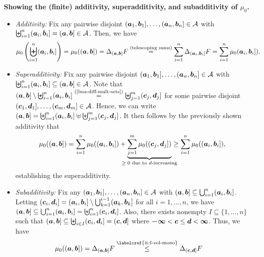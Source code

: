 \begin{enumerate}
\begin{pf}
\textbf{Showing the (finite) additivity, superadditivity, and subadditivity of \(\mu_0\).}
\begin{itemize}
\item \emph{Additivity:} Fix any pairwise disjoint \((\bm{a}_1,\bm{b}_1]
,\dotsc,(\bm{a}_n,\bm{b}_n]\in\mathcal{A}\) with
\(\biguplus_{i=1}^{n}(\bm{a}_i,\bm{b}_i]=(\bm{a},\bm{b}]\in\mathcal{A}\).
Then, we have
\[
\mu_0\left(\biguplus_{i=1}^{n}(\bm{a}_i,\bm{b}_i]\right)
=\mu_0((\bm{a},\bm{b}])
=\Delta_{(\bm{a},\bm{b}]}F
\overset{\text{(telescoping sums)}}{=}\sum_{i=1}^{n}\Delta_{(\bm{a}_i,\bm{b}_i]}F
=\sum_{i=1}^{n}\mu_0(\bm{a}_i,\bm{b}_i]).
\]
\item \emph{Superadditivity:} Fix any pairwise disjoint \((\bm{a}_1,\bm{b}_1]
,\dotsc,(\bm{a}_n,\bm{b}_n]\in\mathcal{A}\) with
\(\biguplus_{i=1}^{n}(\bm{a}_i,\bm{b}_i]\subseteq (\bm{a},\bm{b}]\in\mathcal{A}\).
Note that \((\vect{a},\vect{b}]\setminus \biguplus_{i=1}^{n}(\vect{a}_i,\vect{b}_i]
\overset{\text{(\Cref{lma:diff-mult-sets})}}{=}
\biguplus_{j=1}^{m}(\vect{c}_j,\vect{d}_j]\)
for some pairwise disjoint
\((\bm{c}_1,\bm{d}_1],\dotsc,(\bm{c}_m,\bm{d}_m]\in\mathcal{A}\).
Hence, we can write \((\bm{a},\bm{b}]=\biguplus_{i=1}^{n}(\bm{a}_i,\bm{b}_i]
\uplus\biguplus_{j=1}^{m}(\bm{c}_j,\bm{d}_j]\). It then follows by the
previously shown additivity that
\[
\mu_0((\vect{a},\vect{b}])
=\sum_{i=1}^{n}\mu_0((\vect{a}_i,\vect{b}_i])
+\underbrace{\sum_{j=1}^{m}\mu_0((\vect{c}_j,\vect{d}_j])}_{\mathclap{\text{\(\ge 0\) due to \(d\)-increasing}}}
\ge\sum_{i=1}^{n}\mu_0((\vect{a}_i,\vect{b}_i]),
\]
establishing the superadditivity.
\item \emph{Subadditivity:} Fix any
\((\bm{a}_1,\bm{b}_1],\dotsc,(\bm{a}_n,\bm{b}_n]\in\mathcal{A}\) with
\((\bm{a},\bm{b}]\subseteq \bigcup_{i=1}^{n}(\bm{a}_i,\bm{b}_i]\).
Letting \((\bm{c}_i,\bm{d}_i]=(\bm{a}_i,\bm{b}_i]\setminus
\bigcup_{k=1}^{i-1}(\bm{a}_k,\bm{b}_k]\) for all \(i=1,\dotsc,n\), we have
\((\bm{a},\bm{b}]\subseteq \bigcup_{i=1}^{n}(\bm{a}_i,\bm{b}_i]
=\biguplus_{i=1}^{n}(\bm{c}_i,\bm{d}_i]\). Also, there exists nonempty
\(I\subseteq \{1,\dotsc,n\}\) such that \((\bm{a},\bm{b}]\subseteq
\biguplus_{i\in I}^{}(\bm{c}_i,\bm{d}_i] =(\bm{c},\bm{d}]\)
where \(\bm{-\infty}<\bm{c}\le\bm{d}<\bm{\infty}\). Thus, we have
\begin{align*}
\mu_0((\vect{a},\vect{b}])
&=\Delta_{(\vect{a},\vect{b}]}F
\overset{\text{\labelcref{it:f-vol-mono}}}{\le}\Delta_{(\vect{c},\vect{d}]}F

\end{align*}
\end{itemize}
\end{pf}
\end{enumerate}
